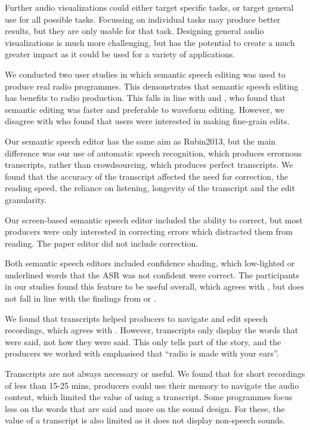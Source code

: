 
Further audio visualizations could either target specific tasks, or target general use for all possible tasks.
Focussing on individual tasks may produce better results, but they are only usable for that task. Designing general
audio visualizations is much more challenging, but has the potential to create a much greater impact as it could be
used for a variety of applications.

We conducted two user studies in which semantic speech editing was used to produce real radio programmes. This
demonstrates that semantic speech editing has benefits to radio production. This falls in line with
\citet{Whittaker2004} and \citet{Sivaraman2016}, who found that semantic editing was faster and preferable to waveform
editing. However, we disagree with \citet{Yoon2014} who found that users were interested in making fine-grain edits.

Our semantic speech editor has the same aim as Rubin2013, but the main difference was our use of automatic speech
recognition, which produces errornous transcripts, rather than crowdsourcing, which produces perfect transcripts. We
found that the accuracy of the transcript affected the need for correction, the reading speed, the reliance on
listening, longevity of the transcript and the edit granularity.

Our screen-based semantic speech editor included the ability to correct, but most producers were only interested in
correcting errors which distracted them from reading. The paper editor did not include correction.

Both semantic speech editors included confidence shading, which low-lighted or underlined words that the ASR was not
confident were correct. The participants in our studies found this feature to be useful overall, which agrees with
\citet{Burke2006}, but does not fall in line with the findings from \citet{Suhm2001} or \citet{Vemuri2004}.

We found that transcripts helped producers to navigate and edit speech recordings, which agrees with
\citet{Whittaker2002}. However, transcripts only display the words that were said, not how they were said. This only
tells part of the story, and the producers we worked with emphasised that ``radio is made with your ears''.

Transcripts are not always necessary or useful. We found that for short recordings of less than 15-25 mins, producers
could use their memory to navigate the audio content, which limited the value of using a transcript. Some programmes
focus less on the words that are said and more on the sound design. For these, the value of a transcript is also
limited as it does not display non-speech sounds.

